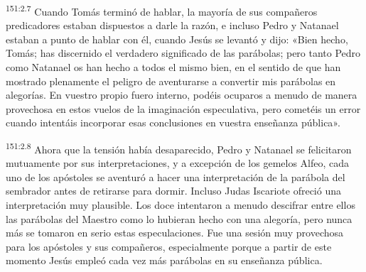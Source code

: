 \par 
\textsuperscript{151:2.7} Cuando Tomás terminó de hablar, la mayoría de sus compañeros predicadores estaban dispuestos a darle la razón, e incluso Pedro y Natanael estaban a punto de hablar con él, cuando Jesús se levantó y dijo: «Bien hecho, Tomás; has discernido el verdadero significado de las parábolas; pero tanto Pedro como Natanael os han hecho a todos el mismo bien, en el sentido de que han mostrado plenamente el peligro de aventurarse a convertir mis parábolas en alegorías. En vuestro propio fuero interno, podéis ocuparos a menudo de manera provechosa en estos vuelos de la imaginación especulativa, pero cometéis un error cuando intentáis incorporar esas conclusiones en vuestra enseñanza pública».

\par 
\textsuperscript{151:2.8} Ahora que la tensión había desaparecido, Pedro y Natanael se felicitaron mutuamente por sus interpretaciones, y a excepción de los gemelos Alfeo, cada uno de los apóstoles se aventuró a hacer una interpretación de la parábola del sembrador antes de retirarse para dormir. Incluso Judas Iscariote ofreció una interpretación muy plausible. Los doce intentaron a menudo descifrar entre ellos las parábolas del Maestro como lo hubieran hecho con una alegoría, pero nunca más se tomaron en serio estas especulaciones. Fue una sesión muy provechosa para los apóstoles y sus compañeros, especialmente porque a partir de este momento Jesús empleó cada vez más parábolas en su enseñanza pública.

